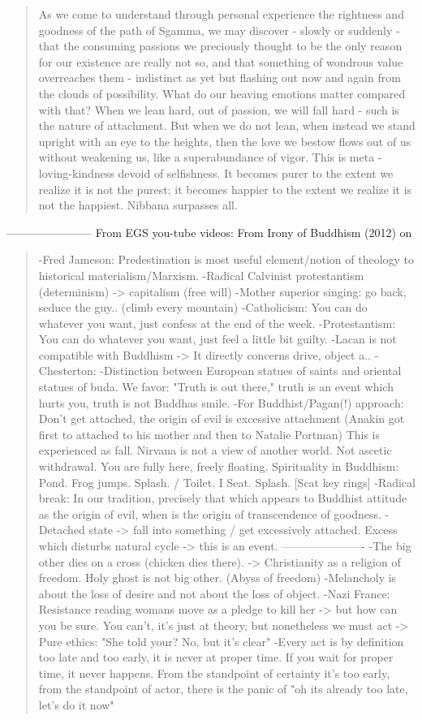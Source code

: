 \documentclass[10pt]{book}
\begin{document}
\begin{quotation}
As we come to understand through personal experience the rightness and goodness of the path of Sgamma, we may discover - slowly or suddenly - that the consuming passions we preciously thought to be the only reason for our existence are really not so, and that something of wondrous value overreaches them - indistinct as yet but flashing out now and again from the clouds of possibility. What do our heaving emotions matter compared with that? When we lean hard, out of passion, we will fall hard - such is the nature of attachment. But when we do not lean, when instead we stand upright with an eye to the heights, then the love we bestow flows out of us without weakening us, like a superabundance of vigor. This is meta - loving-kindness devoid of selfishness. It becomes purer to the extent we realize it is not the purest; it becomes happier to the extent we realize it is not the happiest. Nibbana surpasses all.
\end{quotation}
-----------------------
From EGS you-tube videos: From Irony of Buddhism (2012) on
\begin{quotation}
-Fred Jameson: Predestination is most useful element/notion of theology to historical materialism/Marxism.
-Radical Calvinist protestantism (determinism) -> capitalism (free will)
-Mother superior singing: go back, seduce the guy.. (climb every mountain)
-Catholicism: You can do whatever you want, just confess at the end of the week.
-Protestantism: You can do whatever you want, just feel a little bit guilty.
-Lacan is not compatible with Buddhism -> It directly concerns drive, object a..
-Chesterton:
-Distinction between European statues of saints and oriental statues of buda. We favor: "Truth is out there," truth is an event which hurts you, truth is not Buddhas smile.
-For Buddhist/Pagan(!) approach: Don't get attached, the origin of evil is excessive attachment (Anakin got first to attached to his mother and then to Natalie Portman) This is experienced as fall. Nirvana is not a view of another world. Not ascetic withdrawal. You are fully here, freely floating. Spirituality in Buddhism: Pond. Frog jumps. Splash. / Toilet. I Seat. Splash. [Scat key rings]
-Radical break: In our tradition, precisely that which appears to Buddhist attitude as the origin of evil, when is the origin of transcendence of goodness.
-Detached state -> fall into something / get excessively attached. Excess which disturbs natural cycle -> this is an event.
----------------------
-The big other dies on a cross (chicken dies there). -> Christianity as a religion of freedom. Holy ghost is not big other. (Abyss of freedom)
-Melancholy is about the loss of desire and not about the loss of object.
-Nazi France: Resistance reading womans move as a pledge to kill her -> but how can you be sure. You can't, it's just at theory, but nonetheless we must act -> Pure ethics: "She told your? No, but it's clear"
-Every act is by definition too late and too early, it is never at proper time. If you wait for proper time, it never happens. From the standpoint of certainty it's too early, from the standpoint of actor, there is the panic of "oh its already too late, let's do it now"
\end{quotation}
\end{document}
